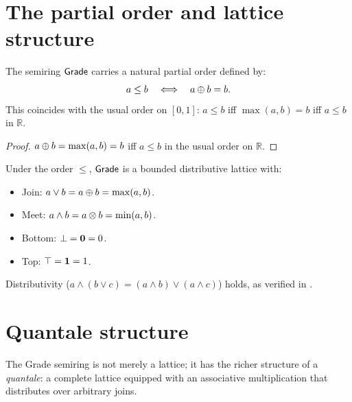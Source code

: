 
\section{The partial order and lattice structure}
\label{sec:grade:order}

\begin{proposition}
\label{prop:grade-order}
The semiring $\mathsf{Grade}$ carries a natural partial order defined by:
\[
  a \leq b \quad \Longleftrightarrow \quad a \oplus b = b.
\]
This coincides with the usual order on $[0, 1]$: $a \leq b$ iff
$\max(a, b) = b$ iff $a \leq b$ in $\mathbb{R}$.
\end{proposition}

\begin{proof}
$a \oplus b = \max(a, b) = b$ iff $a \leq b$ in the usual order on
$\mathbb{R}$.
\end{proof}

\begin{proposition}
\label{prop:grade-lattice}
Under the order $\leq$, $\mathsf{Grade}$ is a bounded distributive lattice
with:
\begin{itemize}[nosep]
\item Join: $a \vee b = a \oplus b = \max(a, b)$.
\item Meet: $a \wedge b = a \otimes b = \min(a, b)$.
\item Bottom: $\bot = \mathbf{0} = 0$.
\item Top: $\top = \mathbf{1} = 1$.
\end{itemize}
Distributivity ($a \wedge (b \vee c) = (a \wedge b) \vee (a \wedge c)$)
holds, as verified in .
\end{proposition}



\section{Quantale structure}
\label{sec:grade:quantale}

The Grade semiring is not merely a lattice; it has the richer structure
of a \emph{quantale}: a complete lattice equipped with an associative
multiplication that distributes over arbitrary joins.


